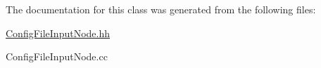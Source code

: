 The documentation for this class was generated from the following files\-:\begin{DoxyCompactItemize}
\item 
\hyperlink{_config_file_input_node_8hh}{Config\-File\-Input\-Node.\-hh}\item 
Config\-File\-Input\-Node.\-cc\end{DoxyCompactItemize}
